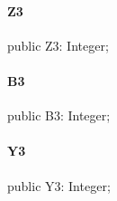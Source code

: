 \documentclass{report}
\begin{document}
\paragraph*{Z3}\hspace*{\fill}

\begin{list}{}{
\setlength{\itemindent}{0cm}
\setlength{\listparindent}{0cm}
\setlength{\leftmargin}{\evensidemargin}
\addtolength{\leftmargin}{\tmplength}
\settowidth{\labelsep}{X}
\addtolength{\leftmargin}{\labelsep}
\setlength{\labelwidth}{\tmplength}
}
\begin{flushleft}
\item[\textbf{Declaration}\hfill]
\begin{ttfamily}
public Z3: Integer;\end{ttfamily}


\end{flushleft}
\end{list}
\paragraph*{B3}\hspace*{\fill}

\begin{list}{}{
\setlength{\itemindent}{0cm}
\setlength{\listparindent}{0cm}
\setlength{\leftmargin}{\evensidemargin}
\addtolength{\leftmargin}{\tmplength}
\settowidth{\labelsep}{X}
\addtolength{\leftmargin}{\labelsep}
\setlength{\labelwidth}{\tmplength}
}
\begin{flushleft}
\item[\textbf{Declaration}\hfill]
\begin{ttfamily}
public B3: Integer;\end{ttfamily}


\end{flushleft}
\end{list}
\paragraph*{Y3}\hspace*{\fill}

\begin{list}{}{
\setlength{\itemindent}{0cm}
\setlength{\listparindent}{0cm}
\setlength{\leftmargin}{\evensidemargin}
\addtolength{\leftmargin}{\tmplength}
\settowidth{\labelsep}{X}
\addtolength{\leftmargin}{\labelsep}
\setlength{\labelwidth}{\tmplength}
}
\begin{flushleft}
\item[\textbf{Declaration}\hfill]
\begin{ttfamily}
public Y3: Integer;\end{ttfamily}


\end{flushleft}
\end{list}
\end{document}
